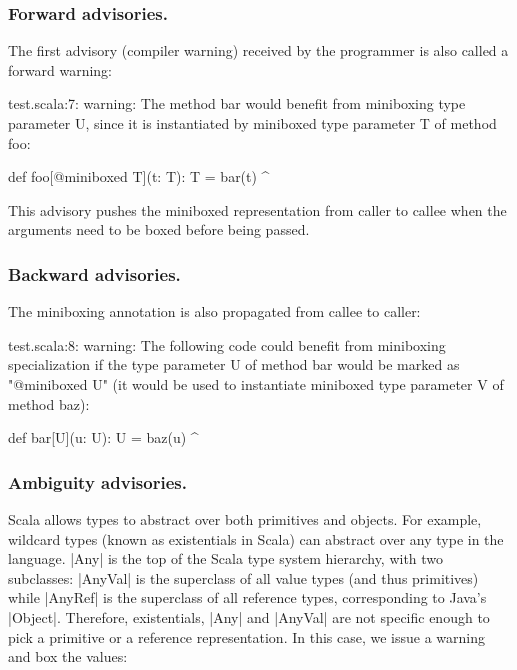 \subsubsection{Forward advisories.} The first advisory (compiler warning) received by the programmer is also called a forward warning:

\begin{lstlisting-nobreak-nolang}
test.scala:7: warning: The method bar would benefit from miniboxing type parameter U, since it is instantiated by miniboxed type parameter T of method foo:

       def foo[@miniboxed T](t: T): T = bar(t)
                                                   ^
\end{lstlisting-nobreak-nolang}

This advisory pushes the miniboxed representation from caller to callee when the arguments need to be boxed before being passed.

\subsubsection{Backward advisories.} The miniboxing annotation is also propagated from callee to caller:

\begin{lstlisting-nobreak-nolang}
test.scala:8: warning: The following code could benefit from miniboxing specialization if the type parameter U of method bar would be marked as "@miniboxed U" (it would be used to instantiate miniboxed type parameter V of method baz):

        def bar[U](u: U): U = baz(u)
                                     ^
\end{lstlisting-nobreak-nolang}

\subsubsection{Ambiguity advisories.} Scala allows types to abstract over both primitives and objects. For example, wildcard types (known as existentials in Scala) can abstract over any type in the language. |Any| is the top of the Scala type system hierarchy, with two subclasses: |AnyVal| is the superclass of all value types (and thus primitives) while |AnyRef| is the superclass of all reference types, corresponding to Java's |Object|. Therefore, existentials, |Any| and |AnyVal| are not specific enough to pick a primitive or a reference representation. In this case, we issue a warning and box the values:

